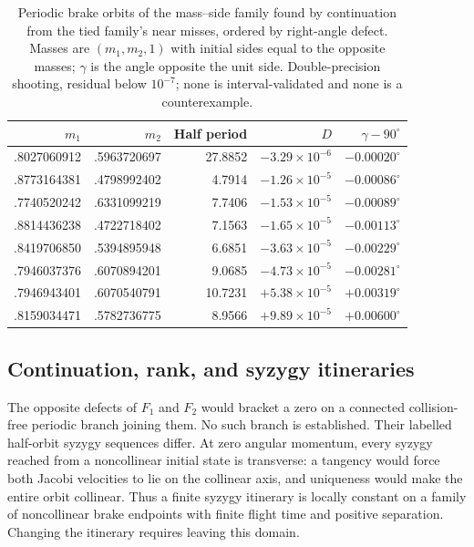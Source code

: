 \begin{table}[htbp]
\centering
\small
\begin{tabular}{rrrrr}
\toprule
$m_1$ & $m_2$ & Half period & $D$ & $\gamma-90^\circ$\\
\midrule
.8027060912 & .5963720697 & 27.8852 & $-3.29\times10^{-6}$ & $-0.00020^\circ$\\
.8773164381 & .4798992402 & 4.7914 & $-1.26\times10^{-5}$ & $-0.00086^\circ$\\
.7740520242 & .6331099219 & 7.7406 & $-1.53\times10^{-5}$ & $-0.00089^\circ$\\
.8814436238 & .4722718402 & 7.1563 & $-1.65\times10^{-5}$ & $-0.00113^\circ$\\
.8419706850 & .5394895948 & 6.6851 & $-3.63\times10^{-5}$ & $-0.00229^\circ$\\
.7946037376 & .6070894201 & 9.0685 & $-4.73\times10^{-5}$ & $-0.00281^\circ$\\
.7946943401 & .6070540791 & 10.7231 & $+5.38\times10^{-5}$ & $+0.00319^\circ$\\
.8159034471 & .5782736775 & 8.9566 & $+9.89\times10^{-5}$ & $+0.00600^\circ$\\
\bottomrule
\end{tabular}
\caption{Periodic brake orbits of the mass--side family found by
continuation from the tied family's near misses, ordered by right-angle
defect. Masses are $(m_1,m_2,1)$ with initial sides equal to the opposite
masses; $\gamma$ is the angle opposite the unit side. Double-precision
shooting, residual below $10^{-7}$; none is interval-validated and none is
a counterexample.}
\label{tab:atlas}
\end{table}

\subsection{Continuation, rank, and syzygy itineraries}

The opposite defects of $F_1$ and $F_2$ would bracket a zero on a connected
collision-free periodic branch joining them. No such branch is established.
Their labelled half-orbit syzygy sequences differ. At zero angular
momentum, every syzygy reached from a noncollinear initial state is
transverse: a tangency would force both Jacobi velocities to lie on the
collinear axis, and uniqueness would make the entire orbit collinear.
Thus a finite syzygy itinerary is locally constant on a family of
noncollinear brake endpoints with finite flight time and positive
separation. Changing the itinerary requires leaving this domain.

